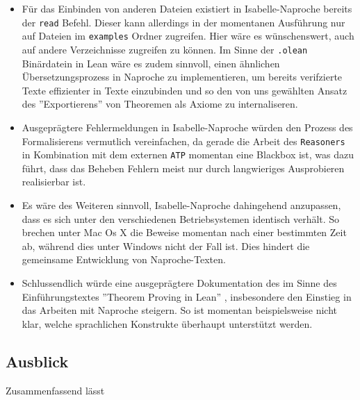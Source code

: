 \documentclass[a4paper,12pt]{scrartcl}
\begin{document}
\begin{itemize}
\item Für das Einbinden von anderen Dateien existiert in Isabelle-Naproche bereits der \verb!read! Befehl. Dieser kann allerdings in der momentanen Ausführung nur auf Dateien im \verb!examples! Ordner zugreifen.
Hier wäre es wünschenswert, auch auf andere Verzeichnisse zugreifen zu können. Im Sinne der \verb!.olean! Binärdatein in Lean wäre es zudem sinnvoll, einen ähnlichen Übersetzungsprozess in Naproche zu implementieren, um bereits verifzierte Texte effizienter in Texte einzubinden und so den von uns gewählten Ansatz des ''Exportierens'' von Theoremen als Axiome zu internaliseren.

\item Ausgeprägtere Fehlermeldungen in Isabelle-Naproche würden den Prozess des Formalisierens vermutlich vereinfachen, da gerade die Arbeit des \verb!Reasoners! in Kombination mit dem externen \verb!ATP! momentan eine Blackbox ist, was dazu führt, dass das Beheben Fehlern meist nur durch langwieriges Ausprobieren realisierbar ist.

\item Es wäre des Weiteren sinnvoll, Isabelle-Naproche dahingehend anzupassen, dass es sich unter den verschiedenen Betriebsystemen identisch verhält. So brechen unter Mac Os X die Beweise momentan nach einer bestimmten Zeit ab, während dies unter Windows nicht der Fall ist. Dies hindert die gemeinsame Entwicklung von Naproche-Texten.

\item Schlussendlich würde eine ausgeprägtere Dokumentation des im Sinne des Einführungstextes ''Theorem Proving in Lean'' \cite{bibtex.e}, insbesondere den Einstieg in das Arbeiten mit Naproche steigern. So ist momentan beispielsweise nicht klar, welche sprachlichen Konstrukte überhaupt unterstützt werden.

\end{itemize}

\subsection{Ausblick}

Zusammenfassend lässt 


\end{document}
